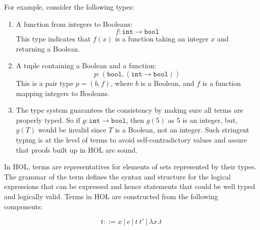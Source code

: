 For example, consider the following types:
\begin{enumerate}
    \item A function from integers to Booleans:
   \[
   f : \texttt{int} \to \texttt{bool}
   \]
   This type indicates that $f(x)$ is a function taking an integer $x$ and returning a Boolean.

    \item A tuple containing a Boolean and a function:
       \[
       p : (\texttt{bool}, (\texttt{int} \to \texttt{bool}))
       \]
       This is a pair type $p = (b, f)$, where $b$ is a Boolean, and $f$ is a function mapping integers to Booleans.
       \item The type system guarantees the consistency by making sure all terms are properly typed. So if $g : \texttt{int} \to \texttt{bool}$, then $g(5)$ as 5 is an integer, but, $g(T)$ would be invalid since $T$ is a Boolean, not an integer. Such stringent typing is at the level of terms to avoid self-contradictory values and assure that proofs built up in HOL are sound.
\end{enumerate}

In HOL, terms are representatives for elements of sets represented by their types. The grammar of the term deﬁnes the syntax and structure for the logical expressions that can be expressed and hence statements that could be well typed and logically valid. Terms in HOL are constructed from the following components:

\[
t ::= x \ | \ c \ | \ t \ t' \ | \ \lambda x. t
\]

